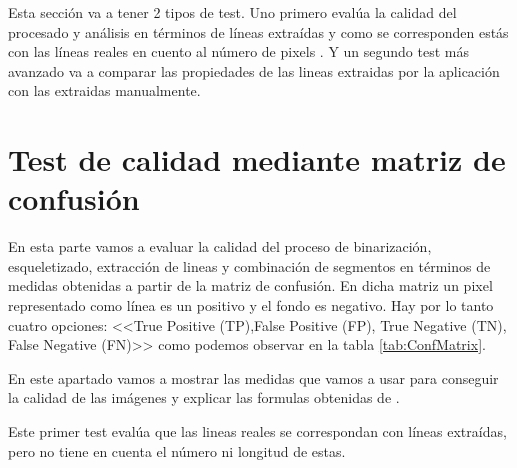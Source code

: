 
Esta sección va a tener 2 tipos de test.
Uno primero evalúa la calidad del procesado y análisis en términos  de líneas extraídas y como se corresponden estás con las líneas reales en cuento al número de pixels .
Y un segundo test más avanzado va a comparar las propiedades de las lineas extraidas por la aplicación con las extraidas manualmente.

\section{Test de calidad mediante matriz de confusión}

En esta parte vamos a evaluar la calidad del proceso de binarización, esqueletizado, extracción de lineas y combinación de segmentos en términos de medidas obtenidas a partir de la matriz de confusión.
En dicha matriz un pixel representado como línea es un positivo y el fondo es negativo. Hay por lo tanto cuatro opciones: <<True Positive (TP),False Positive (FP), True Negative (TN), False Negative (FN)>> como podemos observar en la tabla \ref{tab:ConfMatrix}.

En este apartado vamos a mostrar las medidas que vamos a usar para conseguir la calidad de las imágenes y explicar las formulas obtenidas de \cite{wiki:confMatrix}.

Este primer test evalúa que las lineas reales se correspondan con líneas extraídas, pero no tiene en cuenta el número ni longitud de estas.

